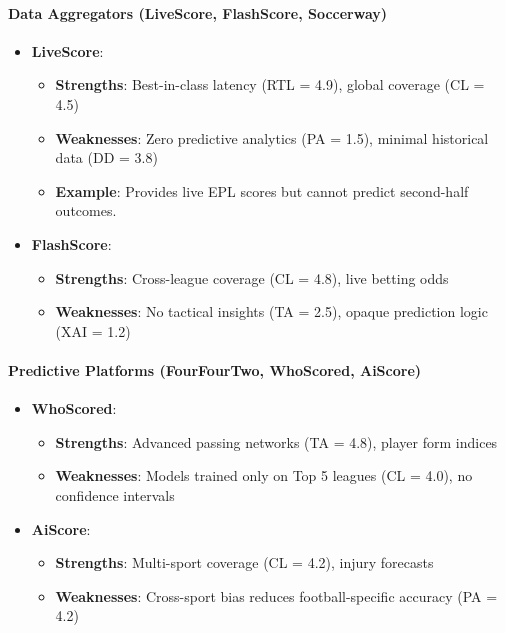 \paragraph{Data Aggregators (LiveScore, FlashScore, Soccerway)}
\begin{itemize}
    \item \textbf{LiveScore}: 
    \begin{itemize}
        \item \textbf{Strengths}: Best-in-class latency (RTL = 4.9), global coverage (CL = 4.5)
        \item \textbf{Weaknesses}: Zero predictive analytics (PA = 1.5), minimal historical data (DD = 3.8)
        \item \textbf{Example}: Provides live EPL scores but cannot predict second-half outcomes.
    \end{itemize}
    
    \item \textbf{FlashScore}: 
    \begin{itemize}
        \item \textbf{Strengths}: Cross-league coverage (CL = 4.8), live betting odds
        \item \textbf{Weaknesses}: No tactical insights (TA = 2.5), opaque prediction logic (XAI = 1.2)
    \end{itemize}
\end{itemize}

\paragraph{Predictive Platforms (FourFourTwo, WhoScored, AiScore)}
\begin{itemize}
    \item \textbf{WhoScored}: 
    \begin{itemize}
        \item \textbf{Strengths}: Advanced passing networks (TA = 4.8), player form indices
        \item \textbf{Weaknesses}: Models trained only on Top 5 leagues (CL = 4.0), no confidence intervals
    \end{itemize}
    
    \item \textbf{AiScore}: 
    \begin{itemize}
        \item \textbf{Strengths}: Multi-sport coverage (CL = 4.2), injury forecasts
        \item \textbf{Weaknesses}: Cross-sport bias reduces football-specific accuracy (PA = 4.2)
    \end{itemize}
\end{itemize}

